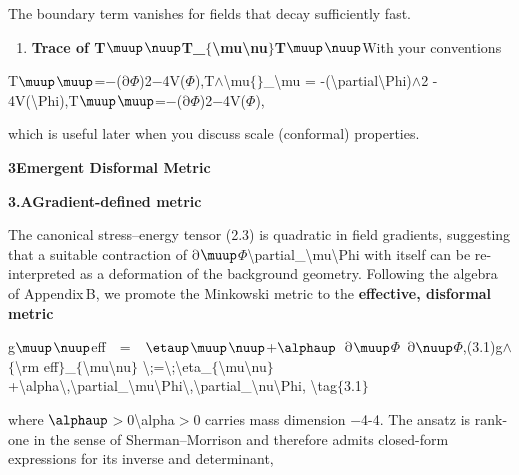 \documentclass{iopjournal}
\begin{document}
The boundary term vanishes for fields that decay sufficiently fast.

\begin{enumerate}
\item  \textbf{Trace of T$\boldsymbol{\muup}$$\boldsymbol{\nuup}$T\_$\boldsymbol{\mathrm{\{}}${\textbackslash}mu{\textbackslash}nu$\boldsymbol{\mathrm{\}}}$T$\boldsymbol{\muup}$$\boldsymbol{\nuup}${}}With your conventions
\end{enumerate}

 T$\muup$$\muup$=$\mathrm{-}$($\mathrm{\partial}$$\Phi$)2$\mathrm{-}$4V($\Phi$),T$\mathrm{\wedge}${\textbackslash}mu$\mathrm{\{}$$\mathrm{\}}$\_{\textbackslash}mu = -({\textbackslash}partial{\textbackslash}Phi)$\mathrm{\wedge}$2 - 4V({\textbackslash}Phi),T$\muup$$\muup${}=$\mathrm{-}$($\mathrm{\partial}$$\Phi$)2$\mathrm{-}$4V($\Phi$),

which is useful later when you discuss scale (conformal) properties.


\textbf{3{\qquad}Emergent Disformal Metric}

\textbf{3.A{\qquad}Gradient-defined metric}

The canonical stress--energy tensor (2.3) is quadratic in field gradients, suggesting that a suitable contraction of $\mathrm{\partial}$$\muup$$\Phi${\textbackslash}partial\_{\textbackslash}mu{\textbackslash}Phi with itself can be re-interpreted as a deformation of the background geometry. Following the algebra of Appendix B, we promote the Minkowski metric to the \textbf{effective, disformal metric}

g$\muup$$\nuup$eff\ \ =\ \ $\etaup$$\muup$$\nuup$+$\alphaup$\ $\mathrm{\partial}$$\muup$$\Phi$\ $\mathrm{\partial}$$\nuup$$\Phi$,(3.1)g$\mathrm{\wedge}$$\mathrm{\{}${\textbackslash}rm eff$\mathrm{\}}$\_$\mathrm{\{}${\textbackslash}mu{\textbackslash}nu$\mathrm{\}}$ {\textbackslash};={\textbackslash};{\textbackslash}eta\_$\mathrm{\{}${\textbackslash}mu{\textbackslash}nu$\mathrm{\}}$ +{\textbackslash}alpha{\textbackslash},{\textbackslash}partial\_{\textbackslash}mu{\textbackslash}Phi{\textbackslash},{\textbackslash}partial\_{\textbackslash}nu{\textbackslash}Phi, {\textbackslash}tag$\mathrm{\{}$3.1$\mathrm{\}}$

where $\alphaup$$\mathrm{>}$0{\textbackslash}alpha$\mathrm{>}$0 carries mass dimension $\mathrm{-}$4-4. The ansatz is rank-one in the sense of Sherman--Morrison and therefore admits closed-form expressions for its inverse and determinant,
\end{document}
